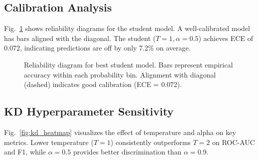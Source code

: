 \documentclass[conference]{IEEEtran}
\begin{document}
\subsection{Calibration Analysis}

Fig.~\ref{fig:calibration} shows reliability diagrams for the student model. A well-calibrated model has bars aligned with the diagonal. The student ($T=1, \alpha=0.5$) achieves ECE of 0.072, indicating predictions are off by only 7.2\% on average.

\begin{figure}[t]
\centering
{}
\caption{Reliability diagram for best student model. Bars represent empirical accuracy within each probability bin. Alignment with diagonal (dashed) indicates good calibration (ECE = 0.072).}
\label{fig:calibration}
\end{figure}

\subsection{KD Hyperparameter Sensitivity}

Fig.~\ref{fig:kd_heatmap} visualizes the effect of temperature and alpha on key metrics. Lower temperature ($T=1$) consistently outperforms $T=2$ on ROC-AUC and F1, while $\alpha=0.5$ provides better discrimination than $\alpha=0.9$.
\end{document}
